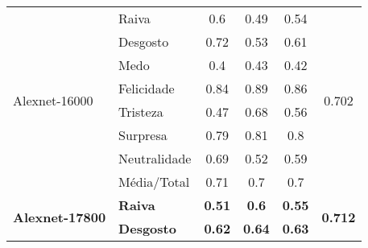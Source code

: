 \begin{table}[]
\begin{tabular}{llcccc}
\multirow{8}{*}{Alexnet-16000}          & Raiva                 & 0.6                                   & 0.49                                   & 0.54                                  & \multirow{8}{*}{0.702}                \\
                                        & Desgosto              & 0.72                                  & 0.53                                   & 0.61                                  &                                       \\
                                        & Medo                  & 0.4                                   & 0.43                                   & 0.42                                  &                                       \\
                                        & Felicidade            & 0.84                                  & 0.89                                   & 0.86                                  &                                       \\
                                        & Tristeza              & 0.47                                  & 0.68                                   & 0.56                                  &                                       \\
                                        & Surpresa              & 0.79                                  & 0.81                                   & 0.8                                   &                                       \\
                                        & Neutralidade          & 0.69                                  & 0.52                                   & 0.59                                  &                                       \\
                                        & Média/Total           & 0.71                                  & 0.7                                    & 0.7                                   &                                       \\ \hline
\multirow{8}{*}{\textbf{Alexnet-17800}} & \textbf{Raiva}        & \textbf{0.51}                         & \textbf{0.6}                           & \textbf{0.55}                         & \multirow{8}{*}{\textbf{0.712}}       \\
                                        & \textbf{Desgosto}     & \textbf{0.62}                         & \textbf{0.64}                          & \textbf{0.63}                         &                                       \\

\end{tabular}
\end{table}
